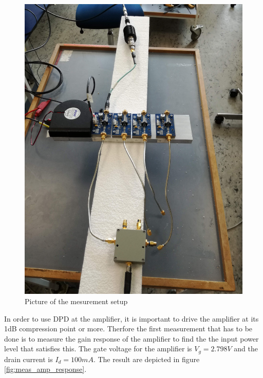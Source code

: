 \begin{figure}[H]
\centering 
\includegraphics[scale = 0.06]{figures/measurement/cree/meas1/meas_set_1.jpg}
\caption{Picture of the mesurement setup }
\label{fig:meas_amp_pic}
\end{figure}
 

In order to use DPD at the amplifier, it is important to drive the amplifier at its 1dB compression point or more. Therfore the first measurement that has to be done is to measure the gain response of the amplifier to find the the input power level that satisfies this. The gate voltage for the amplifier is $V_g = 2.798V$ and the drain current is $I_d = 100mA$. The result are depicted in figure \ref{fig:meas_amp_response}.   

